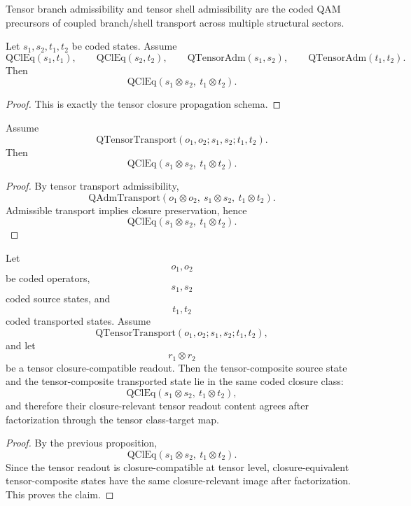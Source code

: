 \begin{remark}
Tensor branch admissibility and tensor shell admissibility are the coded QAM precursors of coupled branch/shell transport across multiple structural sectors.
\end{remark}

\begin{proposition}
Let $s_1,s_2,t_1,t_2$ be coded states. Assume
\[
\mathrm{QClEq}(s_1,t_1),
\qquad
\mathrm{QClEq}(s_2,t_2),
\qquad
\mathrm{QTensorAdm}(s_1,s_2),
\qquad
\mathrm{QTensorAdm}(t_1,t_2).
\]
Then
\[
\mathrm{QClEq}(s_1\otimes s_2,\ t_1\otimes t_2).
\]
\end{proposition}

\begin{proof}
This is exactly the tensor closure propagation schema.
\end{proof}

\begin{proposition}
Assume
\[
\mathrm{QTensorTransport}(o_1,o_2;s_1,s_2;t_1,t_2).
\]
Then
\[
\mathrm{QClEq}(s_1\otimes s_2,\ t_1\otimes t_2).
\]
\end{proposition}

\begin{proof}
By tensor transport admissibility,
\[
\mathrm{QAdmTransport}(o_1\otimes o_2,\ s_1\otimes s_2,\ t_1\otimes t_2).
\]
Admissible transport implies closure preservation, hence
\[
\mathrm{QClEq}(s_1\otimes s_2,\ t_1\otimes t_2).
\]
\end{proof}

\begin{theorem}
Let
\[
o_1,o_2
\]
be coded operators,
\[
s_1,s_2
\]
coded source states,
and
\[
t_1,t_2
\]
coded transported states. Assume
\[
\mathrm{QTensorTransport}(o_1,o_2;s_1,s_2;t_1,t_2),
\]
and let
\[
r_1\otimes r_2
\]
be a tensor closure-compatible readout. Then the tensor-composite source state and the tensor-composite transported state lie in the same coded closure class:
\[
\mathrm{QClEq}(s_1\otimes s_2,\ t_1\otimes t_2),
\]
and therefore their closure-relevant tensor readout content agrees after factorization through the tensor class-target map.
\end{theorem}

\begin{proof}
By the previous proposition,
\[
\mathrm{QClEq}(s_1\otimes s_2,\ t_1\otimes t_2).
\]
Since the tensor readout is closure-compatible at tensor level, closure-equivalent tensor-composite states have the same closure-relevant image after factorization. This proves the claim.
\end{proof}

